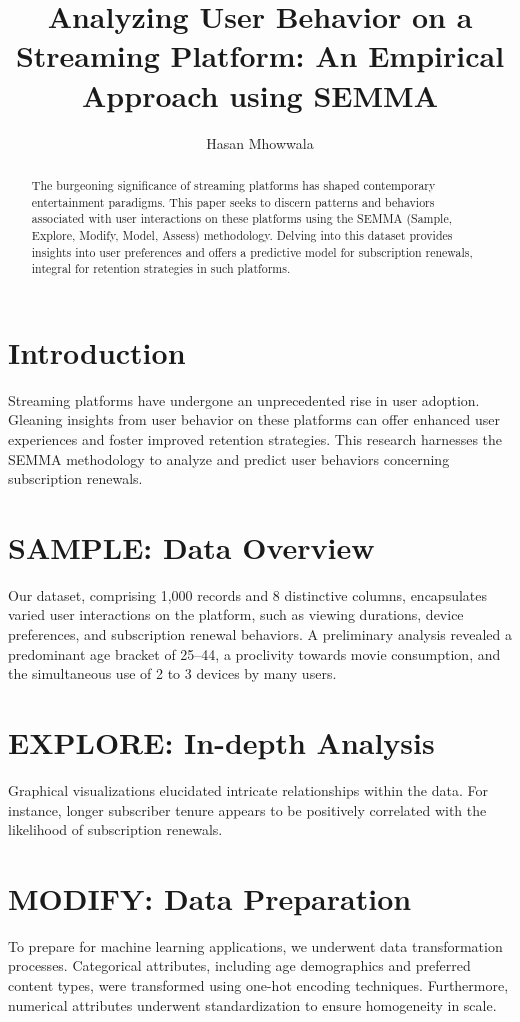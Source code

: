 \documentclass{article}
\title{Analyzing User Behavior on a Streaming Platform: An Empirical Approach using SEMMA}
\author[1]{Hasan Mhowwala}
\affil[1]{San Jose State University}
\begin{document}
\maketitle

\begin{abstract}
The burgeoning significance of streaming platforms has shaped contemporary entertainment paradigms. This paper seeks to discern patterns and behaviors associated with user interactions on these platforms using the SEMMA (Sample, Explore, Modify, Model, Assess) methodology. Delving into this dataset provides insights into user preferences and offers a predictive model for subscription renewals, integral for retention strategies in such platforms.
\end{abstract}

\section{Introduction}
Streaming platforms have undergone an unprecedented rise in user adoption. Gleaning insights from user behavior on these platforms can offer enhanced user experiences and foster improved retention strategies. This research harnesses the SEMMA methodology to analyze and predict user behaviors concerning subscription renewals.

\section{SAMPLE: Data Overview}
Our dataset, comprising 1,000 records and 8 distinctive columns, encapsulates varied user interactions on the platform, such as viewing durations, device preferences, and subscription renewal behaviors. A preliminary analysis revealed a predominant age bracket of 25–44, a proclivity towards movie consumption, and the simultaneous use of 2 to 3 devices by many users.

\section{EXPLORE: In-depth Analysis}
Graphical visualizations elucidated intricate relationships within the data. For instance, longer subscriber tenure appears to be positively correlated with the likelihood of subscription renewals.

\section{MODIFY: Data Preparation}
To prepare for machine learning applications, we underwent data transformation processes. Categorical attributes, including age demographics and preferred content types, were transformed using one-hot encoding techniques. Furthermore, numerical attributes underwent standardization to ensure homogeneity in scale.
\end{document}
